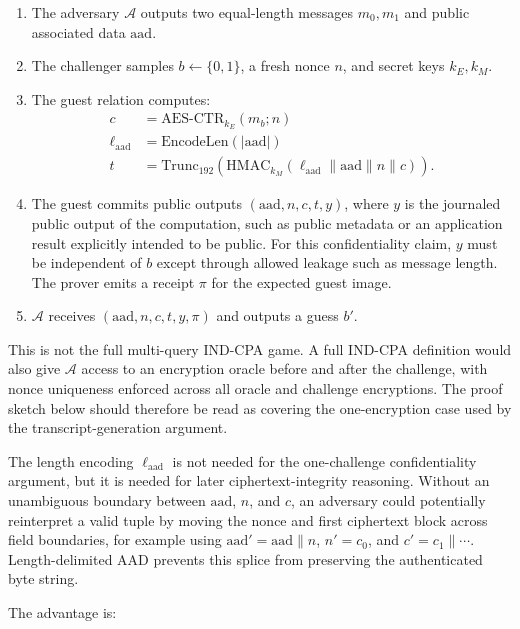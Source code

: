 \begin{enumerate}
\item The adversary \(\mathcal{A}\) outputs two equal-length messages
\(m_0, m_1\) and public associated data \(\mathrm{aad}\).
\item The challenger samples \(b \leftarrow \{0,1\}\), a fresh nonce \(n\), and
secret keys \(k_E, k_M\).
\item The guest relation computes:
\begin{align*}
c &= \mathrm{AES\text{-}CTR}_{k_E}(m_b; n) \\
\ell_{\mathrm{aad}} &= \mathrm{EncodeLen}(|\mathrm{aad}|) \\
t &= \mathrm{Trunc}_{192}(\mathrm{HMAC}_{k_M}(\ell_{\mathrm{aad}} \parallel \mathrm{aad} \parallel n \parallel c)).
\end{align*}
\item The guest commits public outputs \((\mathrm{aad}, n, c, t, y)\), where
\(y\) is the journaled public output of the computation, such as public metadata
or an application result explicitly intended to be public. For this
confidentiality claim, \(y\) must be independent of \(b\) except through allowed
leakage such as message length. The prover emits a receipt \(\pi\) for the
expected guest image.
\item \(\mathcal{A}\) receives \((\mathrm{aad}, n, c, t, y, \pi)\) and outputs a
guess \(b'\).
\end{enumerate}

This is not the full multi-query IND-CPA game. A full IND-CPA definition would
also give \(\mathcal{A}\) access to an encryption oracle before and after the
challenge, with nonce uniqueness enforced across all oracle and challenge
encryptions. The proof sketch below should therefore be read as covering the
one-encryption case used by the transcript-generation argument.

The length encoding \(\ell_{\mathrm{aad}}\) is not needed for the one-challenge
confidentiality argument, but it is needed for later ciphertext-integrity
reasoning. Without an unambiguous boundary between \(\mathrm{aad}\), \(n\), and
\(c\), an adversary could potentially reinterpret a valid tuple by moving the
nonce and first ciphertext block across field boundaries, for example using
\(\mathrm{aad}' = \mathrm{aad} \parallel n\), \(n' = c_0\), and
\(c' = c_1 \parallel \cdots\). Length-delimited AAD prevents this splice from
preserving the authenticated byte string.

The advantage is:

